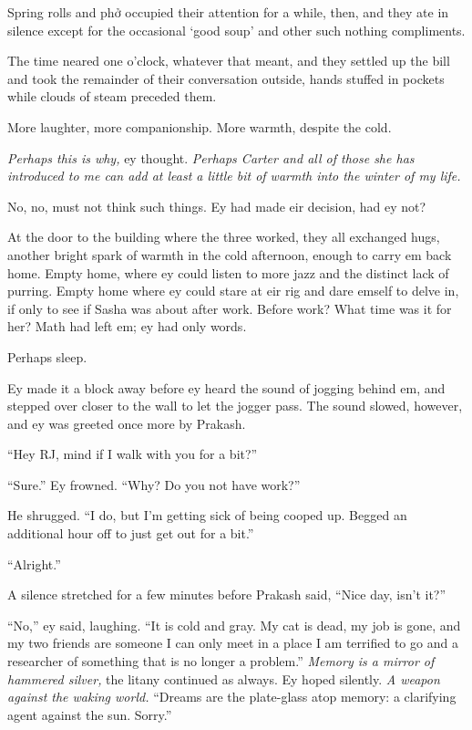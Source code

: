 Spring rolls and phở occupied their attention for a while, then, and they ate in silence except for the occasional `good soup' and other such nothing compliments.

The time neared one o'clock, whatever that meant, and they settled up the bill and took the remainder of their conversation outside, hands stuffed in pockets while clouds of steam preceded them.

More laughter, more companionship. More warmth, despite the cold.

\emph{Perhaps this is why,} ey thought. \emph{Perhaps Carter and all of those she has introduced to me can add at least a little bit of warmth into the winter of my life.}

No, no, must not think such things. Ey had made eir decision, had ey not?

At the door to the building where the three worked, they all exchanged hugs, another bright spark of warmth in the cold afternoon, enough to carry em back home. Empty home, where ey could listen to more jazz and the distinct lack of purring. Empty home where ey could stare at eir rig and dare emself to delve in, if only to see if Sasha was about after work. Before work? What time was it for her? Math had left em; ey had only words.

Perhaps sleep.

Ey made it a block away before ey heard the sound of jogging behind em, and stepped over closer to the wall to let the jogger pass. The sound slowed, however, and ey was greeted once more by Prakash.

``Hey RJ, mind if I walk with you for a bit?''

``Sure.'' Ey frowned. ``Why? Do you not have work?''

He shrugged. ``I do, but I'm getting sick of being cooped up. Begged an additional hour off to just get out for a bit.''

``Alright.''

A silence stretched for a few minutes before Prakash said, ``Nice day, isn't it?''

``No,'' ey said, laughing. ``It is cold and gray. My cat is dead, my job is gone, and my two friends are someone I can only meet in a place I am terrified to go and a researcher of something that is no longer a problem.'' \emph{Memory is a mirror of hammered silver,} the litany continued as always. Ey hoped silently. \emph{A weapon against the waking world.} ``Dreams are the plate-glass atop memory: a clarifying agent against the sun. Sorry.''

